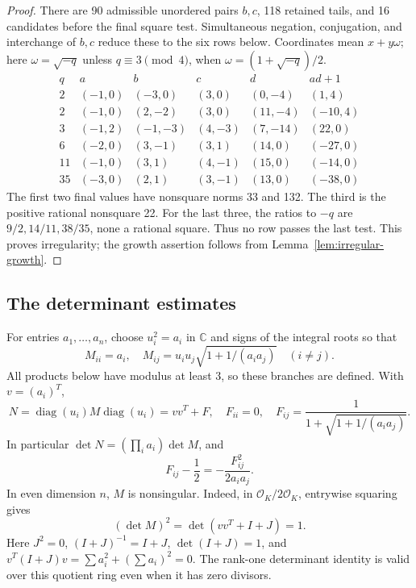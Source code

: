 \documentclass[12pt]{article}
\numberwithin{equation}{section}
\begin{document}
\begin{proof}
There are 90 admissible unordered pairs \(b,c\), 118 retained tails, and 16
candidates before the final square test. Simultaneous negation,
conjugation, and interchange of \(b,c\) reduce these to the six rows below.
Coordinates mean \(x+y\omega\); here \(\omega=\sqrt{-q}\) unless
\(q\equiv3\pmod4\), when \(\omega=(1+\sqrt{-q})/2\).
\[
\begin{array}{c|rrrrr}
q&a&b&c&d&ad+1\\\hline
2&(-1,0)&(-3,0)&(3,0)&(0,-4)&(1,4)\\
2&(-1,0)&(2,-2)&(3,0)&(11,-4)&(-10,4)\\
3&(-1,2)&(-1,-3)&(4,-3)&(7,-14)&(22,0)\\
6&(-2,0)&(3,-1)&(3,1)&(14,0)&(-27,0)\\
11&(-1,0)&(3,1)&(4,-1)&(15,0)&(-14,0)\\
35&(-3,0)&(2,1)&(3,-1)&(13,0)&(-38,0)
\end{array}
\]
The first two final values have nonsquare norms 33 and 132. The third is
the positive rational nonsquare 22. For the last three, the ratios to
\(-q\) are \(9/2,14/11,38/35\), none a rational square. Thus no row
passes the last test. This proves irregularity; the growth assertion
follows from Lemma~\ref{lem:irregular-growth}.
\end{proof}

\subsection{The determinant estimates}
For entries \(a_1,\ldots,a_n\), choose \(u_i^2=a_i\) in \(\mathbb C\)
and signs of the integral roots so that
\[
 M_{ii}=a_i,\quad
 M_{ij}=u_i u_j\sqrt{1+1/(a_i a_j)}\quad(i\ne j).
\]
All products below have modulus at least 3, so these branches are defined.
With \(v=(a_i)^T\),
\begin{equation}\label{eq:integrated-1}
N=\operatorname{diag}(u_i)M\operatorname{diag}(u_i)
   =vv^T+F,\quad F_{ii}=0,\quad
 F_{ij}=\frac1{1+\sqrt{1+1/(a_i a_j)}}.
\end{equation}
In particular \(\det N=(\prod_i a_i)\det M\), and
\begin{equation}\label{eq:integrated-2}
F_{ij}-\frac12=-\frac{F_{ij}^2}{2a_i a_j}.
\end{equation}
In even dimension \(n\), \(M\) is nonsingular. Indeed, in
\(\mathcal O_K/2\mathcal O_K\), entrywise squaring gives
\[
 (\det M)^2=\det(vv^T+I+J)=1.
\]
Here \(J^2=0\), \((I+J)^{-1}=I+J\), \(\det(I+J)=1\), and
\(v^T(I+J)v=\sum a_i^2+(\sum a_i)^2=0\). The rank-one determinant
identity is valid over this quotient ring even when it has zero divisors.
\end{document}
